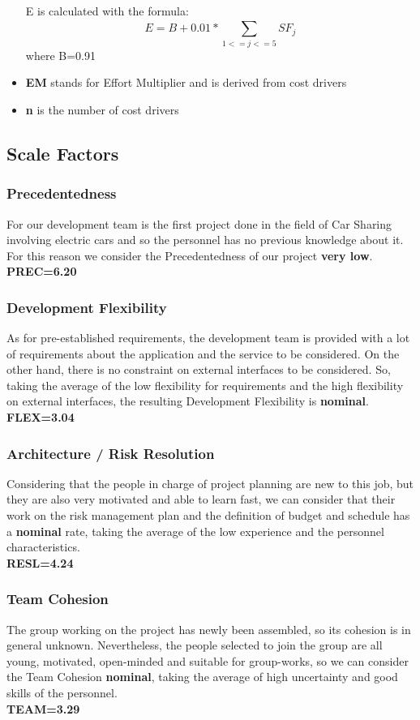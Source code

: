 \begin{itemize}
	E is calculated with the formula:
	\begin{equation}
	E = B + 0.01 * \sum_{1<=j<=5}^{} SF_{j}
	\end{equation}
	where B=0.91
\item \textbf{EM} stands for Effort Multiplier and is derived from cost drivers
\item \textbf{n} is the number of cost drivers
\end{itemize}


\subsection{Scale Factors}
\subsubsection{Precedentedness}
For our development team is the first project done in the field of Car Sharing involving electric cars and so the personnel has no previous knowledge about it. For this reason we consider the Precedentedness of our project \textbf{very low}.\\
\textbf{PREC=6.20}

\subsubsection{Development Flexibility}
As for pre-established requirements, the development team is provided with a lot of requirements about the application and the service to be considered. On the other hand, there is no constraint on external interfaces to be considered.
So, taking the average of the low flexibility for requirements and the high flexibility on external interfaces, the resulting Development Flexibility is \textbf{nominal}.\\
\textbf{FLEX=3.04}

\subsubsection{Architecture / Risk Resolution}
Considering that the people in charge of project planning are new to this job, but they are also very motivated and able to learn fast, we can consider that their work on the risk management plan and the definition of budget and schedule has a \textbf{nominal} rate, taking the average of the low experience and the personnel characteristics.\\
\textbf{RESL=4.24}

\subsubsection{Team Cohesion}
The group working on the project has newly been assembled, so its cohesion is in general unknown. Nevertheless, the people selected to join the group are all young, motivated, open-minded and suitable for group-works, so we can consider the Team Cohesion \textbf{nominal}, taking the average of high uncertainty and good skills of the personnel.\\
\textbf{TEAM=3.29}

